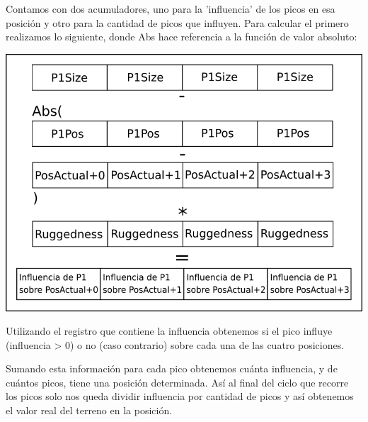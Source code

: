 Contamos con dos acumuladores, uno para la 'influencia' de los picos en esa posición y otro para la cantidad de picos que influyen. Para calcular el primero realizamos lo siguiente, donde Abs hace referencia a la función de valor absoluto:

\begin{center}
\includegraphics[scale=0.5]{imagenes/calculoInfluencia.png} 
\end{center}

Utilizando el registro que contiene la influencia obtenemos si el pico influye (influencia > 0) o no (caso contrario) sobre cada una de las cuatro posiciones.

Sumando esta información para cada pico obtenemos cuánta influencia, y de cuántos picos, tiene una posición determinada. Así al final del ciclo que recorre los picos solo nos queda dividir influencia por cantidad de picos y así obtenemos el valor real del terreno en la posición.
